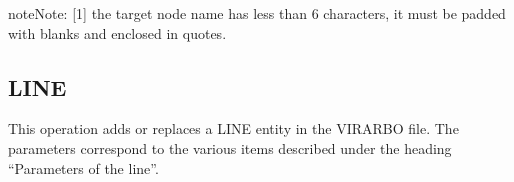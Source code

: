 \documentclass[letterpaper,10pt,english]{sphinxmanual}
\begin{document}
\begin{sphinxadmonition}{note}{Note:}
\sphinxAtStartPar
{[}1{]} the target node name has less than 6 characters, it must be padded with blanks and enclosed in quotes.
\end{sphinxadmonition}

\ignorespaces 

\subsection{LINE}
\label{\detokenize{Installation_Guide:line}}\label{\detokenize{Installation_Guide:index-167}}
\sphinxAtStartPar
This operation adds or replaces a LINE entity in the VIRARBO file. The parameters correspond to the various items described under the heading “Parameters of the line”.
\end{document}
